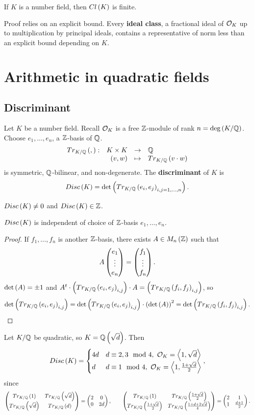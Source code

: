 \begin{theorem}
If $ K $ is a number field, then $ Cl\left( K \right) $ is finite.
\end{theorem}

Proof relies on an explicit bound. Every \textbf{ideal class}, a fractional ideal of $ \mathcal{O}_K $ up to multiplication by principal ideals, contains a representative of norm less than an explicit bound depending on $ K $.

\pagebreak

\section{Arithmetic in quadratic fields}

\subsection{Discriminant}

Let $ K $ be a number field. Recall $ \mathcal{O}_K $ is a free $ \mathbb{Z} $-module of rank $ n = \deg\left( K / \mathbb{Q} \right) $. Choose $ e_1, \dots, e_n $, a $ \mathbb{Z} $-basis of $ \mathbb{Q} $.
$$ \function[Tr_{K / \Q}\rb{,}]{K \times K}{\Q}{\rb{v, w}}{Tr_{K / \Q}\rb{v \cdot w}} $$
is symmetric, $ \mathbb{Q} $-bilinear, and non-degenerate. The \textbf{discriminant} of $ K $ is
$$ Disc\left( K \right) = \det\left( Tr_{K / \mathbb{Q}}\left( e_i, e_j \right)_{i, j = 1, \dots, n} \right). $$

\begin{remark*}
$ Disc\left( K \right) \ne 0 $ and $ Disc\left( K \right) \in \mathbb{Z} $.
\end{remark*}

\begin{lemma}
$ Disc\left( K \right) $ is independent of choice of $ \mathbb{Z} $-basis $ e_1, \dots, e_n $.
\end{lemma}

\begin{proof}
If $ f_1, \dots, f_n $ is another $ \mathbb{Z} $-basis, there exists $ A \in M_n\left( \mathbb{Z} \right) $ such that
$$ A\begin{pmatrix} e_1 \\ \vdots \\ e_n \end{pmatrix} = \begin{pmatrix} f_1 \\ \vdots \\ f_n \end{pmatrix}. $$
$ \det\left( A \right) = \pm 1 $ and $ A^t \cdot \left( Tr_{K / \mathbb{Q}}\left( e_i, e_j \right)_{i, j} \right) \cdot A = \left( Tr_{K / \mathbb{Q}}\left( f_i, f_j \right)_{i, j} \right) $, so
$$ \det\left( Tr_{K / \mathbb{Q}}\left( e_i, e_j \right)_{i, j} \right) = \det\left( Tr_{K / \mathbb{Q}}\left( e_i, e_j \right)_{i, j} \right) \cdot \left( \det\left( A \right) \right)^2 = \det\left( Tr_{K / \mathbb{Q}}\left( f_i, f_j \right)_{i, j} \right). $$
\end{proof}

\begin{example*}
Let $ K / \mathbb{Q} $ be quadratic, so $ K = \mathbb{Q}\left( \sqrt{d} \right) $. Then
$$ Disc\left( K \right) =
\begin{cases}
4d & d \equiv 2, 3 \mod 4, \ \mathcal{O}_K = \left\langle 1, \sqrt{d} \right\rangle \\
d & d \equiv 1 \mod 4, \ \mathcal{O}_K = \left\langle 1, \tfrac{1 + \sqrt{d}}{2} \right\rangle
\end{cases},
$$
since
$$ \begin{pmatrix} Tr_{K / \mathbb{Q}}\left( 1 \right) & Tr_{K / \mathbb{Q}}\left( \sqrt{d} \right) \\ Tr_{K / \mathbb{Q}}\left( \sqrt{d} \right) & Tr_{K / \mathbb{Q}}\left( d \right) \end{pmatrix} = \begin{pmatrix} 2 & 0 \\ 0 & 2d \end{pmatrix}, \qquad \begin{pmatrix} Tr_{K / \mathbb{Q}}\left( 1 \right) & Tr_{K / \mathbb{Q}}\left( \tfrac{1 + \sqrt{d}}{2} \right) \\ Tr_{K / \mathbb{Q}}\left( \tfrac{1 + \sqrt{d}}{2} \right) & Tr_{K / \mathbb{Q}}\left( \tfrac{1 + d + 2\sqrt{d}}{4} \right) \end{pmatrix} = \begin{pmatrix} 2 & 1 \\ 1 & \tfrac{d + 1}{2} \end{pmatrix}. $$
\end{example*}

